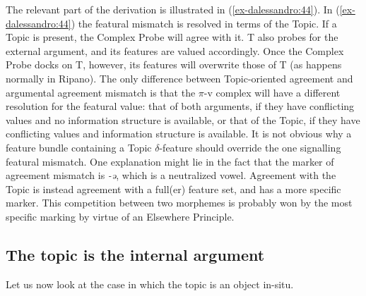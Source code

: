 \documentclass[output=paper
,modfonts
,nonflat]{langsci/langscibook}
\begin{document}
\begin{figure}[!h]
	\begin{exe}
	\end{exe} \vspace{-0.8cm}
\end{figure}
\noindent The relevant part of the derivation is illustrated in (\ref{ex-dalessandro:44}). In (\ref{ex-dalessandro:44}) the featural mismatch is resolved in terms of the Topic. If a Topic is present, the Complex Probe will agree with it. T also probes for the external argument, and its features are valued accordingly. Once the Complex Probe docks on T, however, its features will overwrite those of T (as happens normally in Ripano). The only difference between Topic-oriented agreement and argumental agreement mismatch is that the $\pi $-v complex will have a different resolution for the featural value: that of both arguments, if they have conflicting values and no information structure is available, or that of the Topic, if they have conflicting values and information structure is available.  
It is not obvious why a feature bundle containing a Topic $\delta $-feature should override the one signalling featural mismatch. One explanation might lie in the fact that the marker of agreement mismatch is \textit{{}-ə}, which is a neutralized vowel. Agreement with the Topic is instead agreement with a full(er) feature set, and has a more specific marker. This competition between two morphemes is probably won by the most specific marking by virtue of an Elsewhere Principle. 

\subsection{The topic is the internal argument}\label{sec-dalessandro:5.2}
Let us now look at the case in which the topic is an object in-situ. 
\end{document}
